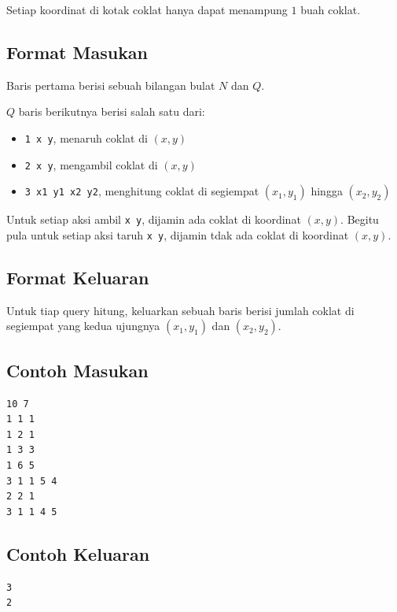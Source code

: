 \documentclass{article}
\begin{document}
\par\noindent Setiap koordinat di kotak coklat hanya dapat menampung $1$ buah coklat.

\subsection*{Format Masukan}

\par\noindent Baris pertama berisi sebuah bilangan bulat $N$ dan $Q$.
\par\noindent $Q$ baris berikutnya berisi salah satu dari:
\begin{itemize}
	\item \lstinline{1 x y}, menaruh coklat di $(x,y)$
	\item \lstinline{2 x y}, mengambil coklat di $(x,y)$
	\item \lstinline{3 x1 y1 x2 y2}, menghitung coklat di segiempat $(x_1,y_1)$ hingga $(x_2,y_2)$
\end{itemize}
\par\noindent Untuk setiap aksi ambil \lstinline{x y}, dijamin ada coklat di koordinat $(x,y)$. Begitu pula untuk setiap aksi taruh \lstinline{x y}, dijamin tdak ada coklat di koordinat $(x,y)$.

\subsection*{Format Keluaran}

\par\noindent Untuk tiap query hitung, keluarkan sebuah baris berisi jumlah coklat di segiempat yang kedua ujungnya $(x_1,y_1)$ dan $(x_2,y_2)$.

\subsection*{Contoh Masukan}

\begin{lstlisting}
10 7
1 1 1
1 2 1
1 3 3
1 6 5
3 1 1 5 4
2 2 1
3 1 1 4 5
\end{lstlisting}

\subsection*{Contoh Keluaran}

\begin{lstlisting}
3
2
\end{lstlisting}
\end{document}
